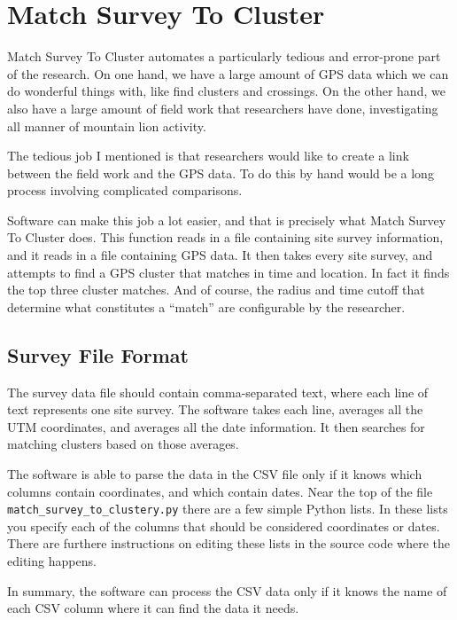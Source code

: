 \chapter{Match Survey To Cluster}
\hypertarget{match-survey-to-cluster}{}

Match Survey To Cluster automates a particularly tedious and
error-prone part of the research. On one hand, we have a large amount
of GPS data which we can do wonderful things with, like find clusters
and crossings. On the other hand, we also have a large amount of field
work that researchers have done, investigating all manner of mountain
lion activity.

The tedious job I mentioned is that researchers would like to create a
link between the field work and the GPS data. To do this by hand would
be a long process involving complicated comparisons.

Software can make this job a lot easier, and that is precisely what
Match Survey To Cluster does. This function reads in a file containing
site survey information, and it reads in a file containing GPS data.
It then takes every site survey, and attempts to find a GPS cluster
that matches in time and location. In fact it finds the top three
cluster matches. And of course, the radius and time cutoff that
determine what constitutes a ``match'' are configurable by the
researcher.

\section{Survey File Format}

The survey data file should contain comma-separated text, where each
line of text represents one site survey. The software takes each line,
averages all the UTM coordinates, and averages all the date
information. It then searches for matching clusters based on those
averages.

The software is able to parse the data in the CSV file only if it
knows which columns contain coordinates, and which contain dates. Near
the top of the file \verb=match_survey_to_clustery.py= there are a few
simple Python lists. In these lists you specify each of the columns
that should be considered coordinates or dates. There are furthere
instructions on editing these lists in the source code where the
editing happens.

In summary, the software can process the CSV data only if it knows the
name of each CSV column where it can find the data it needs.

